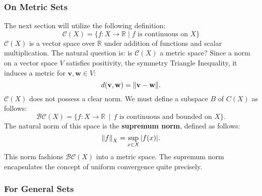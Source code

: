 \documentclass[11pt]{article}
\renewcommand{\vec}[1]{\mathbf{#1}}
\begin{document}

\subsubsection*{On Metric Sets}

The next section will utilize the following definition: 
\[
	\mathcal{C}(X) = \{ f : X \to \mathbb{R} \mid f \text{ is continuous on } X \}
\]
$\mathcal{C}(X)$ is a vector space over $\mathbb{R}$ under addition of functions and scalar multiplication. The natural question is: is $\mathcal{C}(X)$ a metric space? Since a norm on a vector space $V$ satisfies positivity, the symmetry Triangle Inequality, it induces a metric for $\vec{v}, \vec{w} \in V$:
\[
	d(\vec{v}, \vec{w}) = \norm{\vec{v} - \vec{w}}.
\]
$\mathcal{C}(X)$ does not possess a clear norm. We must define a subspace $B$ of $C(X)$ as follows:
\[
	\mathcal{BC}(X) = \{ f : X \to \mathbb{R} \, \mid \, f \text{ is continuous and bounded on } X \}.
\]
The natural norm of this space is the \textbf{supremum norm}, defined as follows:
\[
	\norm{f}_{X} = \sup\limits_{x \in X} \abs{f(x)}.
\]
This norm fashions $\mathcal{BC}(X)$ into a metric space. The supremum norm encapsulates the concept of uniform convergence quite precisely.


\subsubsection*{For General Sets}
\end{document}
